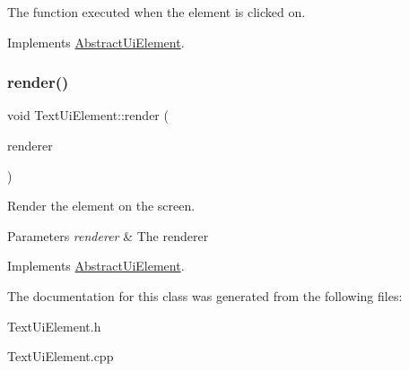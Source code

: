 The function executed when the element is clicked on. 



Implements \mbox{\hyperlink{class_abstract_ui_element_a42296c15c9e70b6ac7fda0b1862612af}{Abstract\+Ui\+Element}}.

\mbox{\label{class_text_ui_element_a7931ba283acdf102442a9181b3ddf276}} 
\subsubsection{\texorpdfstring{render()}{render()}}
{\footnotesize\ttfamily void Text\+Ui\+Element\+::render (\begin{DoxyParamCaption}\item[{S\+D\+L\+\_\+\+Renderer $\ast$}]{renderer }\end{DoxyParamCaption})\hspace{0.3cm}{\ttfamily [virtual]}}



Render the element on the screen. 


\begin{DoxyParams}{Parameters}
{\em renderer} & The renderer\\
\hline
\end{DoxyParams}


Implements \mbox{\hyperlink{class_abstract_ui_element_afacedc89a5805d95d3bdcf20619b1c06}{Abstract\+Ui\+Element}}.



The documentation for this class was generated from the following files\+:\begin{DoxyCompactItemize}
\item 
Text\+Ui\+Element.\+h\item 
Text\+Ui\+Element.\+cpp\end{DoxyCompactItemize}
